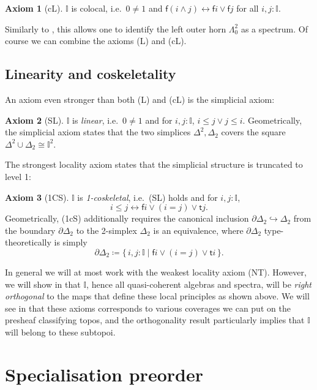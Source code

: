 \documentclass[a4paper,12pt]{amsart}
\theoremstyle{definition}
\newtheorem*{axiom}{Axiom}
\newcommand{\mbb}[1]{\mathbb{#1}}
\newcommand{\I}{\mbb I}
\newcommand{\ms}[1]{\mathsf{#1}}
\newcommand{\scomp}[2]{\{\,#1\mid#2\,\}}
\newcommand{\hook}{\hookrightarrow}
\newcommand{\eq}{\leftrightarrow}
\begin{document}
\begin{axiom}[cL]\label{ax:cL}
  $\I$ is colocal, i.e.\ $0 \neq 1$ and $\ms f(i \wedge j) \eq \ms fi \vee \ms fj$ for all $i,j : \I$.
\end{axiom}

Similarly to , this allows one to identify the left outer horn $\Lambda^2_0$ as a spectrum. Of course we can combine the axioms (L) and (cL). 

\subsection{Linearity and coskeletality}

An axiom even stronger than both (L) and (cL) is the simplicial axiom:

\begin{axiom}[SL]\label{ax:SL}
  $\I$ is \emph{linear}, i.e.\ $0 \neq 1$ and for $i,j : \I$, $i \le j \vee j \le i$. Geometrically, the simplicial axiom states that the two simplices $\Delta^2,\Delta_2$ covers the square $\Delta^2 \cup \Delta_2 \cong \I^2$.
\end{axiom}

The strongest locality axiom states that the simplicial structure is truncated to level 1:

\begin{axiom}[1CS]\label{ax:1cS}
  $\I$ is \emph{1-coskeletal}, i.e.\ (SL) holds and for $i,j : \I$, 
  \[ i \le j \eq \ms fi \vee (i = j)\vee \ms tj. \]
  Geometrically, (1cS) additionally requires the canonical inclusion $\partial\Delta_2 \hook \Delta_2$ from the boundary $\partial\Delta_2$ to the 2-simplex $\Delta_2$ is an equivalence, where $\partial\Delta_2$ type-theoretically is simply
  \[ \partial\Delta_2 \coloneq \scomp{i,j : \I}{\ms fi \vee (i = j) \vee \ms ti}. \]
\end{axiom}

In general we will at most work with the weakest locality axiom (NT). However, we will show in  that $\I$, hence all quasi-coherent algebras and spectra, will be \emph{right orthogonal} to the maps that define these local principles as shown above. We will see in  that these axioms corresponds to various coverages we can put on the presheaf classifying topos, and the orthogonality result particularly implies that $\I$ will belong to these subtopoi.



\section{Specialisation preorder}\label{sec:intposet}
\end{document}
